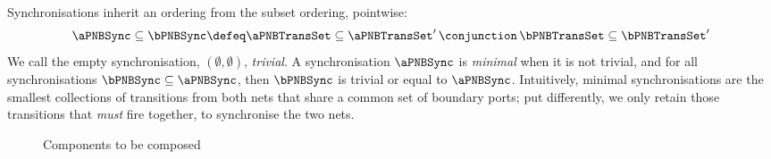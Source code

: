 Synchronisations inherit an ordering from the subset ordering, pointwise:
\[
    \aPNBSync \subseteq \bPNBSync \defeq \aPNBTransSet \subseteq \aPNBTransSet'
\,\conjunction\, \bPNBTransSet \subseteq \bPNBTransSet'
\] We call the empty synchronisation, $(\emptyset, \emptyset)$, \emph{trivial}.
A synchronisation $\aPNBSync$ is \emph{minimal} when it is not trivial, and for
all synchronisations $\bPNBSync \subseteq \aPNBSync$, then $\bPNBSync$ is
trivial or equal to $\aPNBSync$. Intuitively, minimal synchronisations are the
smallest collections of transitions from both nets that share a common set of
boundary ports; put differently, we only retain those transitions that
\emph{must} fire together, to synchronise the two nets.

\begin{figure}[ht]
\centering
\begin{subfigure}{0.5\textwidth}
    \centering
{}
\end{subfigure}%
\begin{subfigure}{0.5\textwidth}
    \centering
{}
\end{subfigure}%
\caption{Components to be composed}
\label{fig:exampleSeqComp}
\end{figure}

